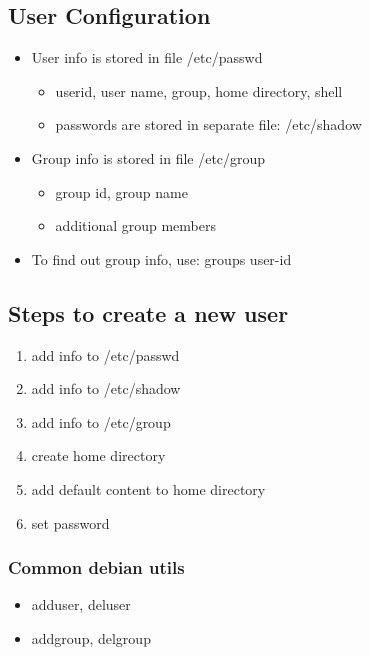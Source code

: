 \documentclass{report}
\begin{document}
    \subsection{User Configuration}
    \begin{itemize}
        \item User info is stored in file /etc/passwd
            \begin{itemize}
                \item userid, user name, group, home directory, shell
                \item passwords are stored in separate file: /etc/shadow
            \end{itemize}
        \item Group info is stored in file /etc/group
            \begin{itemize}
                \item group id, group name
                \item additional group members
            \end{itemize}
        \item To find out group info, use: groups user-id
    \end{itemize}

    \bigbreak \noindent 
    \subsection{Steps to create a new user}
    \begin{enumerate}
        \item add info to /etc/passwd
        \item add info to /etc/shadow
        \item add info to /etc/group
        \item create home directory
        \item add default content to home directory
        \item set password
    \end{enumerate}
    \bigbreak \noindent 
    \subsubsection{Common debian utils}
    \begin{itemize}
        \item adduser, deluser
        \item addgroup, delgroup
    \end{itemize}
\end{document}
